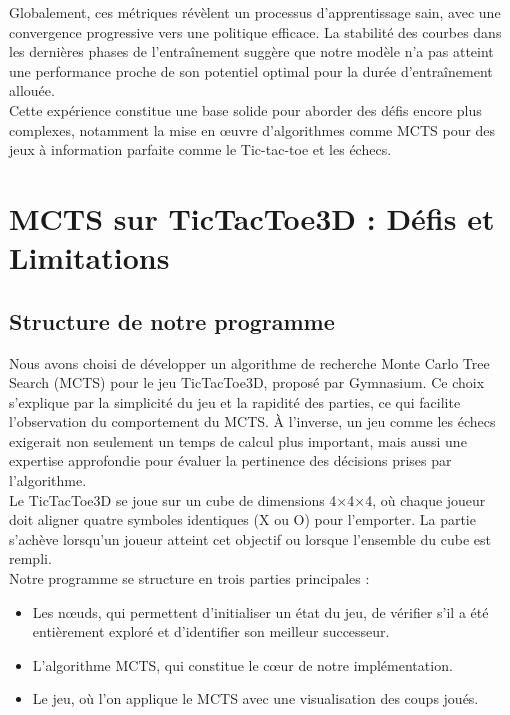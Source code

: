 \documentclass{article}
\begin{document}
        Globalement, ces métriques révèlent un processus d'apprentissage sain, avec une convergence progressive vers une politique efficace. La stabilité des courbes dans les dernières phases de l'entraînement suggère que notre modèle  n’a pas atteint une performance proche de son potentiel optimal pour la durée d'entraînement allouée.\\
    
        Cette expérience constitue une base solide pour aborder des défis encore plus complexes, notamment la mise en œuvre d'algorithmes comme MCTS pour des jeux à information parfaite comme le Tic-tac-toe et les échecs.

\clearpage

\section{MCTS sur TicTacToe3D : Défis et Limitations}

\subsection{Structure de notre programme}

\quad Nous avons choisi de développer un algorithme de recherche Monte Carlo Tree Search (MCTS) pour le jeu TicTacToe3D, proposé par Gymnasium. Ce choix s'explique par la simplicité du jeu et la rapidité des parties, ce qui facilite l'observation du comportement du MCTS. À l'inverse, un jeu comme les échecs exigerait non seulement un temps de calcul plus important, mais aussi une expertise approfondie pour évaluer la pertinence des décisions prises par l'algorithme.\\

Le TicTacToe3D se joue sur un cube de dimensions 4×4×4, où chaque joueur doit aligner quatre symboles identiques (X ou O) pour l'emporter. La partie s'achève lorsqu'un joueur atteint cet objectif ou lorsque l'ensemble du cube est rempli.\\

Notre programme se structure en trois parties principales :
\begin{itemize} 
    \item Les nœuds, qui permettent d'initialiser un état du jeu, de vérifier s'il a été entièrement exploré et d'identifier son meilleur successeur.
    \item L'algorithme MCTS, qui constitue le cœur de notre implémentation.
    \item Le jeu, où l'on applique le MCTS avec une visualisation des coups joués.
\end{itemize}
\end{document}
